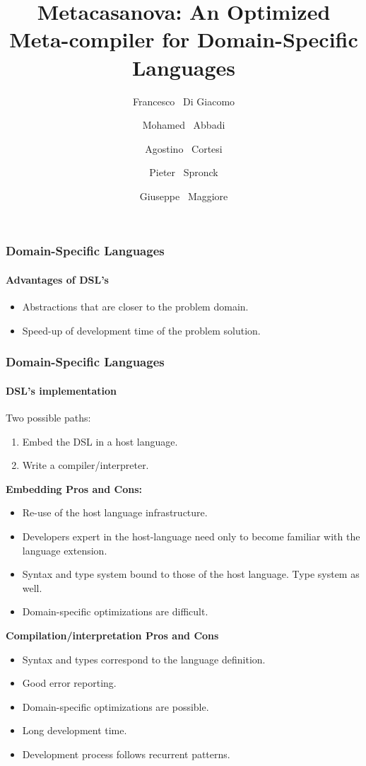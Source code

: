 \documentclass[10pt,a4paper]{beamer}
\begin{document}
\author[Di Giacomo et al.]
{Francesco ~Di Giacomo  \\
	\and Mohamed ~Abbadi  \\
	\and Agostino ~Cortesi  \\
	\and Pieter ~Spronck  \\
	\and Giuseppe ~Maggiore }
\date{}
\title{Metacasanova: An Optimized Meta-compiler for Domain-Specific Languages}

\frame{\titlepage}

\begin{frame}
\frametitle{Domain-Specific Languages}
\framesubtitle{Advantages of DSL's}
\begin{itemize}
	\item Abstractions that are closer to the problem domain.
	\item Speed-up of development time of the problem solution.	
\end{itemize}
\end{frame}

\begin{frame}
\frametitle{Domain-Specific Languages}
\framesubtitle{DSL's implementation}

Two possible paths:

\begin{enumerate}
	\item Embed the DSL in a host language.
	\item Write a compiler/interpreter.
\end{enumerate}

\textbf{Embedding Pros and Cons:}

\begin{itemize}
	\item Re-use of the host language infrastructure.
	\item Developers expert in the host-language need only to become familiar with the language extension.
	\item Syntax and type system bound to those of the host language. Type system as well.
	\item Domain-specific optimizations are difficult.
\end{itemize}

\textbf{Compilation/interpretation Pros and Cons}

\begin{itemize}
	\item Syntax and types correspond to the language definition.
	\item Good error reporting.
	\item Domain-specific optimizations are possible.
	\item Long development time.
	\item Development process follows recurrent patterns.
\end{itemize}
\end{frame}
\end{document}

